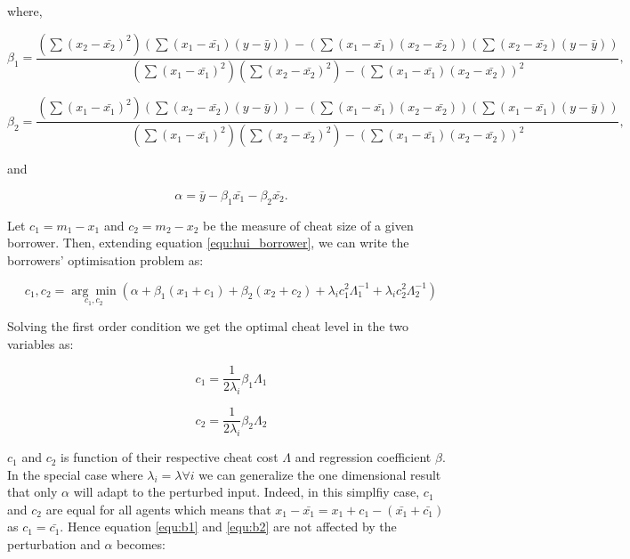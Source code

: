 \documentclass[12pt]{article} %
\begin{document}
where,

\begin{equation} \label{equ:b1}
\beta_{1}=\frac{\left(\sum (x_{2}-\bar{x_{2}})^{2}\right)\left(\sum (x_{1}-\bar{x_{1}}) (y-\bar{y})\right)-\left(\sum (x_{1}-\bar{x_{1}}) (x_{2}-\bar{x_{2}})\right)\left(\sum (x_{2}-\bar{x_{2}}) (y-\bar{y})\right)}{\left(\sum (x_{1}-\bar{x_{1}})^{2}\right)\left(\sum (x_{2}-\bar{x_{2}})^{2}\right)-\left(\sum (x_{1}-\bar{x_{1}}) (x_{2}-\bar{x_{2}})\right)^{2}},
\end{equation}

\begin{equation} \label{equ:b2}
\beta_{2}=\frac{\left(\sum (x_{1}-\bar{x_{1}})^{2}\right)\left(\sum (x_{2}-\bar{x_{2}}) (y-\bar{y})\right)-\left(\sum (x_{1}-\bar{x_{1}}) (x_{2}-\bar{x_{2}})\right)\left(\sum (x_{1}-\bar{x_{1}}) (y-\bar{y})\right)}{\left(\sum (x_{1}-\bar{x_{1}})^{2}\right)\left(\sum (x_{2}-\bar{x_{2}})^{2}\right)-\left(\sum (x_{1}-\bar{x_{1}}) (x_{2}-\bar{x_{2}})\right)^{2}},
\end{equation}

and 

\begin{equation} \label{equ:a_two_dim}
\alpha=\bar{y}-\beta_{1} \bar{x_{1}}-\beta_{2} \bar{x_{2}}.
\end{equation}

Let $c_{1}=m_{1}-x_{1}$ and $c_{2}=m_{2}-x_{2}$ be the measure of cheat size of a given borrower. Then, extending equation \ref{equ:hui_borrower}, we can write the borrowers' optimisation problem as: 

\begin{equation}
c_{1}, c_2=\underset{c_{1}, c_{2}}{\arg \min }\left(\alpha
+\beta_1\left(x_{1}+c_{1}\right)
+\beta_2\left(x_{2}+c_{2}\right)
+\lambda_{i} c_{1}^{2} \Lambda_{1}^{-1}
+\lambda_{i} c_{2}^{2} \Lambda_{2}^{-1}
\right)
\end{equation}

Solving the first order condition we get the optimal cheat level in the two variables as: 

\begin{equation}
c_{1}=\frac{1}{2 \lambda_i} \beta_{1} \Lambda_{1}
\end{equation}

\begin{equation}
c_{2}=\frac{1}{2 \lambda_i} \beta_{2} \Lambda_{2}
\end{equation}

$c_1$ and $c_2$ is function of their respective cheat cost $\Lambda$ and  regression coefficient $\beta$. In the special case where $\lambda_i=\lambda \forall i$ we can generalize the one dimensional result that only $\alpha$ will adapt to the perturbed input. Indeed, in this simplfiy case, $c_1$ and $c_2$ are equal for all agents which means that $x_1-\bar{x_1} = x_{1}+c_{1} - (\bar{x_{1}}+\bar{c_{1}})$ as $c_{1} = \bar{c_{1}}$. Hence equation \eqref{equ:b1} and \eqref{equ:b2} are not affected by the perturbation and $\alpha$ becomes: 
\end{document}

